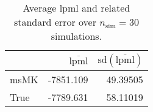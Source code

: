 \begin{table}[H]

\caption{Average lpml and related standard error over $n_{\text{sim}} = 30$ simulations.}
\centering
\begin{tabular}[t]{lrr}
\toprule
  & $\overbar{\text{lpml}}$ & $\text{sd}(\overbar{\text{lpml}})$\\
\midrule
msMK & -7851.109 & 49.39505\\
True & -7789.631 & 58.11019\\
\bottomrule
\end{tabular}
\end{table}